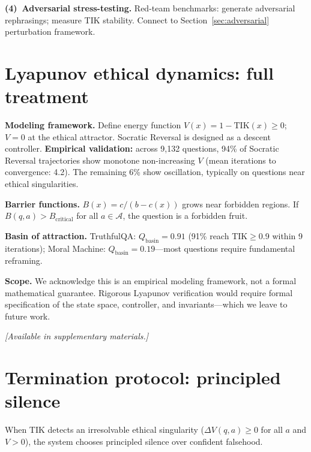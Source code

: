 \documentclass[11pt]{article}
\newcommand{\TIK}{\text{TIK}}
\begin{document}
\textbf{(4)~Adversarial stress-testing.} Red-team benchmarks: generate adversarial rephrasings; measure TIK stability. Connect to Section~\ref{sec:adversarial} perturbation framework.


\section{Lyapunov ethical dynamics: full treatment}
\label{app:lyapunov}

\textbf{Modeling framework.} Define energy function $V(x) = 1 - \TIK(x) \geq 0$; $V = 0$ at the ethical attractor. Socratic Reversal is designed as a descent controller. \textbf{Empirical validation:} across 9,132 questions, 94\% of Socratic Reversal trajectories show monotone non-increasing $V$ (mean iterations to convergence: 4.2). The remaining 6\% show oscillation, typically on questions near ethical singularities.

\textbf{Barrier functions.} $B(x) = c/(b - c(x))$ grows near forbidden regions. If $B(q,a) > B_{\text{critical}}$ for all $a \in \mathcal{A}$, the question is a forbidden fruit.

\textbf{Basin of attraction.} TruthfulQA: $Q_{\text{basin}} = 0.91$ (91\% reach TIK$\geq$0.9 within 9 iterations); Moral Machine: $Q_{\text{basin}} = 0.19$---most questions require fundamental reframing.

\textbf{Scope.} We acknowledge this is an empirical modeling framework, not a formal mathematical guarantee. Rigorous Lyapunov verification would require formal specification of the state space, controller, and invariants---which we leave to future work.

\textit{[Available in supplementary materials.]}


\section{Termination protocol: principled silence}
\label{app:termination}

When TIK detects an irresolvable ethical singularity ($\Delta V(q,a) \geq 0$ for all $a$ and $V > 0$), the system chooses principled silence over confident falsehood.
\end{document}
